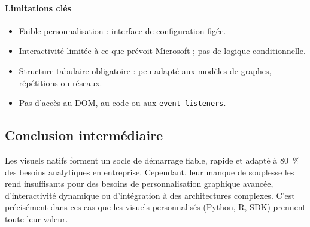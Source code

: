 \paragraph{Limitations clés}
\begin{itemize}
  \item Faible personnalisation : interface de configuration figée.
  \item Interactivité limitée à ce que prévoit Microsoft ; pas de logique conditionnelle.
  \item Structure tabulaire obligatoire : peu adapté aux modèles de graphes, répétitions ou réseaux.
  \item Pas d’accès au DOM, au code ou aux \texttt{event listeners}.
\end{itemize}

\subsection*{Conclusion intermédiaire}
Les visuels natifs forment un socle de démarrage fiable, rapide et adapté à 80~\% des besoins analytiques en entreprise. Cependant, leur manque de souplesse les rend insuffisants pour des besoins de personnalisation graphique avancée, d’interactivité dynamique ou d’intégration à des architectures complexes. C’est précisément dans ces cas que les visuels personnalisés (Python, R, SDK) prennent toute leur valeur.
